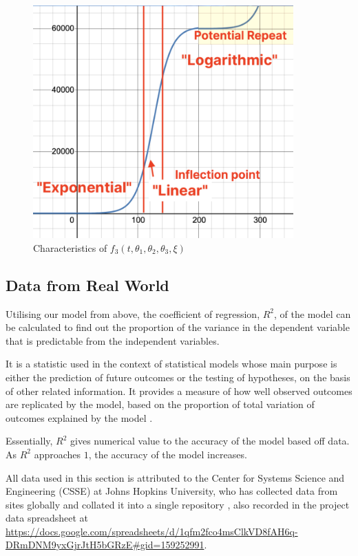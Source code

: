 \documentclass[a4paper,titlepage]{article}
\begin{document}
\begin{figure}[htbp]
    \centering
    \includegraphics[width=10cm]{covidGraph.png}
    \caption{Characteristics of $f_3(t,\theta_1,\theta_2,\theta_3,\xi)$}
    \label{fig:covidGraph}
\end{figure}

\subsection{Data from Real World}

Utilising our model from above, the coefficient of regression, $R^2$, of the model can be calculated to find out the proportion of the variance in the dependent variable that is predictable from the independent variables. 

It is a statistic used in the context of statistical models whose main purpose is either the prediction of future outcomes or the testing of hypotheses, on the basis of other related information. It provides a measure of how well observed outcomes are replicated by the model, based on the proportion of total variation of outcomes explained by the model \cite{regression_draper_smith_1998}.

Essentially, $R^2$ gives numerical value to the accuracy of the model based off data. As $R^2$ approaches $1$, the accuracy of the model increases.

All data used in this section is attributed to the Center for Systems Science and Engineering (CSSE) at Johns Hopkins University, who has collected data from sites globally and collated it into a single repository \cite{globaldata_cssegisanddata_2021}, also recorded in the project data spreadsheet at \url{https://docs.google.com/spreadsheets/d/1qfm2fco4msClkVD8fAH6q-DRmDNM9yxGjrJtH5bGRzE#gid=159252991}.
\end{document}

